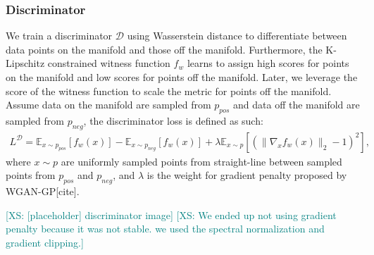\documentclass{article}
\theoremstyle{plain}
\theoremstyle{definition}
\theoremstyle{remark}
\newcommand{\xin}[1]{\textcolor{teal}{[XS: #1]}}
\begin{document}
\subsubsection{Discriminator}
We train a discriminator $\mathcal{D}$ using Wasserstein distance to differentiate between data points on the manifold and those off the manifold. Furthermore, the K-Lipschitz constrained witness function $f_{w}$ learns to assign high scores for points on the manifold and low scores for points off the manifold. Later, we leverage the score of the witness function to scale the metric for points off the manifold. Assume data on the manifold are sampled from $p_{pos}$ and data off the manifold are sampled from $p_{neg}$, the discriminator loss is defined as such:
\begin{align}
    L^{\mathcal{D}} = \mathbb E_{x \sim p_{pos}} [f_w(x)] - \mathbb E_{x \sim p_{neg}} [f_w(x)] +
    \lambda \mathbb E_{x \sim p} [(\| \nabla_x f_w(x) \|_2 - 1)^2],
\end{align}
where ${x \sim p}$ are uniformly sampled points from straight-line between sampled points from $p_{pos}$ and $p_{neg}$, and $\lambda$ is the weight for gradient penalty proposed by WGAN-GP[cite].

\par\xin{[placeholder] discriminator image}
\xin{We ended up not using gradient penalty because it was not stable. we used the spectral normalization and gradient clipping.}



\end{document}
